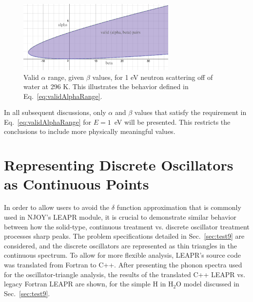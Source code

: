 \documentclass[Master.tex]{subfiles}
\begin{document}
                        \begin{figure}[h]
                          \begin{center}
                            \includegraphics[width=0.7\textwidth]{valid_ab_pairs}
                            \caption[Valid $\alpha$ and $\beta$ values for a 1eV neutron scattering from H$_2$O]{Valid $\alpha$ range, given $\beta$ values, for 1 eV neutron scattering off of water at 296 K. This illustrates the behavior defined in Eq.~\ref{eq:validAlphaRange}.}
                            \label{fig:valid_ab_pairs}
                          \end{center}
                        \end{figure}
                        In all subsequent discussions, only $\alpha$ and $\beta$ values that satisfy the requirement in Eq.~\ref{eq:validAlphaRange} for $E=1$~eV will be presented. This restricts the conclusions to include more physically meaningful values.







\section{Representing Discrete Oscillators as Continuous Points}
  In order to allow users to avoid the $\delta$ function approximation that is commonly used in NJOY's LEAPR module, it is crucial to demonstrate similar behavior between how the solid-type, continuous treatment vs. discrete oscillator treatment processes sharp peaks. The problem specifications detailed in Sec.~\ref{sec:test9} are considered, and the discrete oscillators are represented as thin triangles in the continuous spectrum. To allow for more flexible analysis, LEAPR's source code was translated from Fortran to C++. After presenting the phonon spectra used for the oscillator-triangle analysis, the results of the translated C++ LEAPR vs. legacy Fortran LEAPR are shown, for the simple H in H$_2$O model discussed in Sec.~\ref{sec:test9}.
\end{document}
